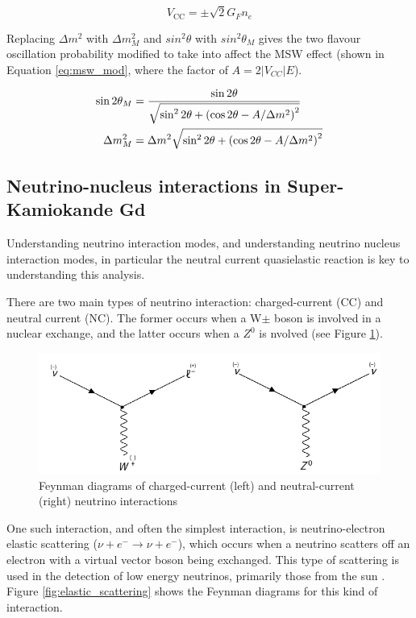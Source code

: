 \begin{equation}
    V_{\mathrm{CC}}=\pm \sqrt{2} G_{F} n_{e}
\label{eq:msw_vcc}
\end{equation}

Replacing $\Delta m^{2}$ with $\Delta m^{2}_{M}$ and $sin^{2}\theta$ with $sin^{2}\theta_{M}$ gives the two flavour oscillation probability modified to take into affect the MSW effect (shown in Equation \ref{eq:msw_mod}, where the factor of $A = 2|V_{CC}|E$).


\begin{align}
\sin 2 \theta_{M} &=\frac{\sin 2 \theta}{\sqrt{\sin ^{2} 2 \theta+\left(\cos 2 \theta-A / \Delta m^{2}\right)^{2}}} \label{eq:msw_mod}\\
\Delta m_{M}^{2} &=\Delta m^{2} \sqrt{\sin ^{2} 2 \theta+\left(\cos 2 \theta-A / \Delta m^{2}\right)^{2}} \notag
\end{align}



\subsection{Neutrino-nucleus interactions in Super-Kamiokande Gd}
Understanding neutrino interaction modes, and understanding neutrino nucleus interaction modes, in particular the neutral current quasielastic reaction is key to understanding this analysis. 

There are two main types of neutrino interaction: charged-current (CC) and neutral current (NC). The former occurs when a W$\pm$ boson is involved in a nuclear exchange, and the latter occurs when a $Z^{0}$ is nvolved (see Figure \ref{fig:CC_NC}).

\begin{figure}
    \centering
    \includegraphics[width=\textwidth]{Figures/CC_NC.png}
    \caption{Feynman diagrams of charged-current (left) and neutral-current (right) neutrino interactions}
    \label{fig:CC_NC}
\end{figure}


One such interaction, and often the simplest interaction, is neutrino-electron elastic scattering ($\nu+e^{-} \rightarrow \nu+e^{-}$), which occurs when a neutrino scatters off an electron with a virtual vector boson being exchanged. This type of scattering is used in the detection of low energy neutrinos, primarily those from the sun \cite{RevModPhys.59.505}. Figure \ref{fig:elastic_scattering} shows the Feynman diagrams for this kind of interaction.


